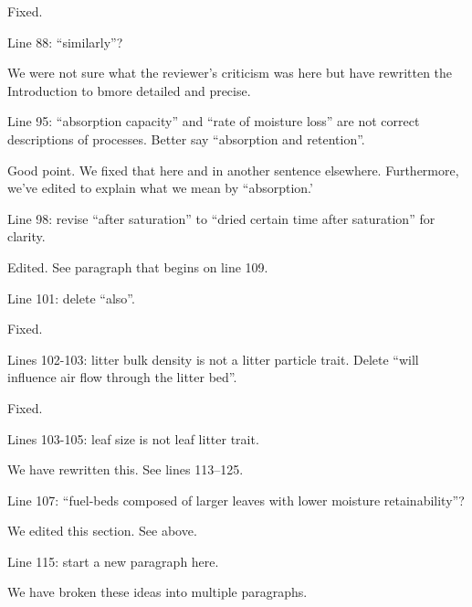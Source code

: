\documentclass[letterpaper, 12pt]{letter}
\begin{document}
\begin{letter}{}
Fixed.

\begin{quoting}
Line 88: “similarly”?
\end{quoting}

We were not sure what the reviewer's criticism was here but have rewritten the
Introduction to bmore detailed and precise.

\begin{quoting}
  Line 95: “absorption capacity” and “rate of moisture loss” are not correct
  descriptions of processes. Better say “absorption and retention”.
\end{quoting}

Good point. We fixed that here and in another sentence elsewhere. Furthermore,
we've edited to explain what we mean by ``absorption.'

\begin{quoting}
  Line 98: revise “after saturation” to “dried certain time after saturation”
  for clarity.
\end{quoting}

Edited. See paragraph that begins on line 109.

\begin{quoting}
  Line 101: delete “also”.
\end{quoting}

Fixed.

\begin{quoting}
  Lines 102-103: litter bulk density is not a litter particle trait. Delete
  “will influence air flow through the litter bed”.
\end{quoting}

Fixed.

\begin{quoting}
  Lines 103-105: leaf size is not leaf litter trait.
\end{quoting}

We have rewritten this. See lines 113--125.

\begin{quoting}
  Line 107: “fuel-beds composed of larger leaves with lower moisture
  retainability”?
\end{quoting}

We edited this section. See above.

\begin{quoting}
  Line 115: start a new paragraph here.
\end{quoting}

We have broken these ideas into multiple paragraphs.


\end{letter}
\end{document}
